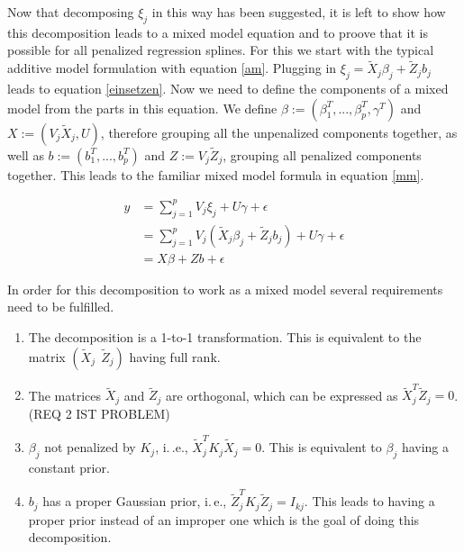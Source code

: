\documentclass[12pt]{article}
\begin{document}
Now that decomposing $\xi_j$ in this way has been suggested, it is left to show how this decomposition leads to a mixed model equation and to proove that it is possible for all penalized regression splines.
For this we start with the typical additive model formulation with equation \ref{am}. Plugging in 
$\xi_j = \tilde{X}_j \beta_j + \tilde{Z}_j b_j$ leads to equation \ref{einsetzen}. Now we need to define the components of a mixed model from the parts in this equation. We define $\beta := (\beta_1^T,..., \beta_p^T, \gamma^T)$ and $X := (V_j \tilde{X}_j, U)$, therefore grouping all the unpenalized components together, as well as $b := (b_1^T,...,b_p^T)$ and $Z := V_j \tilde{Z}_j$, grouping all penalized components together. This leads to the familiar mixed model formula in equation \ref{mm}. 



\begin{align}
y &= \sum_{j=1}^p V_j \xi_j + U\gamma + \epsilon\label{am}\\
 &= \sum_{j=1}^p V_j(\tilde{X}_j \beta_j + \tilde{Z}_j b_j) + U\gamma + \epsilon\label{einsetzen}\\
 &=   X\beta + Zb + \epsilon\label{mm}
\end{align}

In order for this decomposition to work as a mixed model several requirements need to be fulfilled.

\begin{enumerate}
\item The decomposition is a 1-to-1 transformation. This is equivalent to the matrix $(\tilde{X}_j \:\:  \tilde{Z}_j)$ having full rank. \label{1}
\item The matrices $\tilde{X}_j$ and $\tilde{Z}_j$ are orthogonal, which can be expressed as $\tilde{X}_j^T \tilde{Z}_j = 0$. (REQ 2 IST PROBLEM) \label{2}
\item $\beta_j$ not penalized by $K_j$, i.\,.e., $\tilde{X}_j^T K_j \tilde{X}_j = 0$. This is equivalent to $\beta_j$ having a constant prior. \label{3}
\item $b_j$ has a proper Gaussian prior, i.\,e., $\tilde{Z}_j^T K_j \tilde{Z}_j = I_{kj}$. This leads to having a proper prior instead of an improper one which is the goal of doing this decomposition. \label{4}
\end{enumerate}
\end{document}
